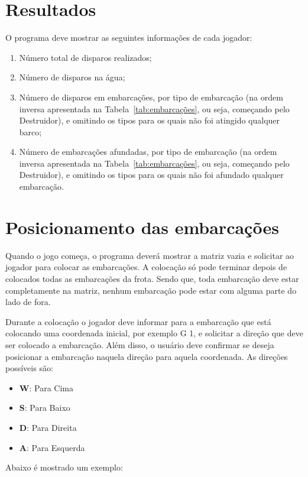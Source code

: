 \documentclass[defesa,oneside]{ppginf}
\begin{document}
\section{Resultados}

O programa deve mostrar as seguintes informações de cada jogador:

\begin{enumerate}
	\item Número total de disparos realizados;
	\item Número de disparos na água;
	\item Número de disparos em embarcações, por tipo de embarcação (na ordem inversa apresentada na Tabela~\ref{tab:embarcações}, ou seja, começando pelo Destruidor), e omitindo os tipos para os quais não foi atingido qualquer barco;
	\item Número de embarcações afundadas, por tipo de embarcação (na ordem inversa apresentada na Tabela~\ref{tab:embarcações}, ou seja, começando pelo Destruidor), e omitindo os tipos para os quais não foi afundado qualquer embarcação.
\end{enumerate}

\section{Posicionamento das embarcações}

Quando o jogo começa, o programa deverá mostrar a matriz vazia e solicitar ao jogador para colocar as embarcações. A colocação só pode terminar depois de colocados todas as embarcações da frota. Sendo que, toda embarcação deve estar completamente na matriz, nenhum embarcação pode estar com alguma parte do lado de fora.

Durante a colocação o jogador deve informar para a embarcação que está colocando uma coordenada inicial, por exemplo G 1, e solicitar a direção que deve ser colocado a embarcação. Além disso, o usuário deve confirmar se deseja posicionar a embarcação naquela direção para aquela coordenada. As direções possíveis são:

\begin{itemize}
	\item \textbf{W}: Para Cima
	\item \textbf{S}: Para Baixo
	\item \textbf{D}: Para Direita
	\item \textbf{A}: Para Esquerda
\end{itemize}

Abaixo é mostrado um exemplo:
\end{document}
